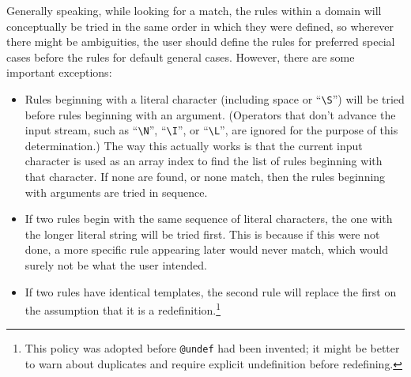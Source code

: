 Generally speaking, while looking for a match, the rules within a domain will
conceptually be tried in the same order in which they were defined, so
wherever there might be ambiguities, the user should define the rules
for preferred special cases before the rules for default general cases.
However, there are some important exceptions:
\begin{itemize}
\item Rules beginning with a literal character (including space or
``\verb/\S/'') will be tried before rules beginning with an argument.
(Operators that don't advance the input stream, such as ``\verb/\N/'',
``\verb/\I/'', or ``\verb/\L/'', are ignored for the purpose of this
determination.)  The way this actually works is that the current input
character is used as an array index to find the list of rules beginning
with that character.  If none are found, or none match, then the rules
beginning with arguments are tried in sequence.

\item If two rules begin with the same sequence of literal characters,
the one with the longer literal string will be tried first.  This is
because if this were not done, a more specific rule appearing later
would never match, which would surely not be what the user intended.

\item If two rules have identical templates, the second rule will replace the
first on the assumption that it is a redefinition.\footnote{This policy
was adopted before {\tt @undef} had been invented; it might be better to
warn about duplicates and require explicit undefinition before redefining.}
\end{itemize}

